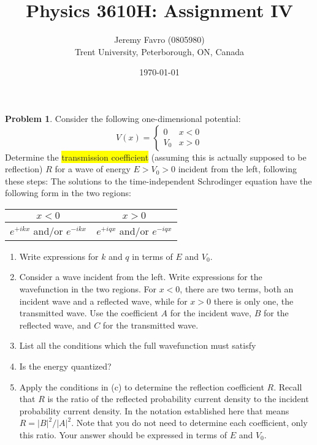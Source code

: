\documentclass[10pt]{article}
\title{Physics 3610H: Assignment IV}
\author{Jeremy Favro (0805980) \\ Trent University, Peterborough, ON, Canada}
\date{\today}
\theoremstyle{definition}
\newtheorem{problem}{Problem}
\begin{document}
\maketitle

\begin{problem}
Consider the following one-dimensional potential:
$$
  V(x)=\begin{cases}
    0   & x<0 \\
    V_0 & x>0
  \end{cases}
$$
Determine the \colorbox{yellow}{transmission coefficient} (assuming this is actually supposed to be reflection)
$R$ for a wave of energy $E > V_0 > 0$ incident from the
left, following these steps:
The solutions to the time-independent Schrodinger equation have the following form in the
two regions:
\begin{table}[h]
  \centering
  \begin{tabular}{c|c}
    $x<0$                        & $x>0$                        \\
    \hline
    $e^{+ikx}$ and/or $e^{-ikx}$ & $e^{+iqx}$ and/or $e^{-iqx}$
  \end{tabular}
\end{table}
\begin{enumerate}[label=(\alph*)]
  \item Write expressions for $k$ and $q$ in terms of $E$ and $V_0$.
  \item Consider a wave incident from the left. Write expressions for the wavefunction in the
        two regions. For $x < 0$, there are two terms, both an incident wave and a reflected wave,
        while for $x > 0$ there is only one, the transmitted wave. Use the coefficient $A$ for the incident
        wave, $B$ for the reflected wave, and $C$ for the transmitted wave.
  \item List all the conditions which the full wavefunction must satisfy
  \item Is the energy quantized?
  \item Apply the conditions in (c) to determine the reflection coefficient $R$. Recall that $R$ is the
        ratio of the reflected probability current density to the incident probability current density.
        In the notation established here that means $R = |B|^2/|A|^2$. Note that you do not need to
        determine each coefficient, only this ratio. Your answer should be expressed in terms of $E$
        and $V_0$.
\end{enumerate}
\end{problem}
\end{document}
